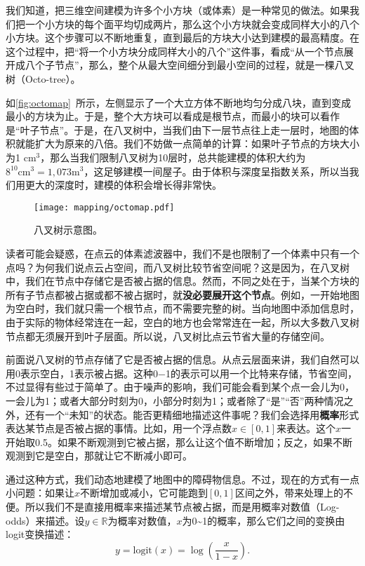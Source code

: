 我们知道，把三维空间建模为许多个小方块（或体素）是一种常见的做法。如果我们把一个小方块的每个面平均切成两片，那么这个小方块就会变成同样大小的八个小方块。这个步骤可以不断地重复，直到最后的方块大小达到建模的最高精度。在这个过程中，把“将一个小方块分成同样大小的八个”这件事，看成“从一个节点展开成八个子节点”，那么，整个从最大空间细分到最小空间的过程，就是一棵八叉树（Octo-tree）。

如\autoref{fig:octomap}~所示，左侧显示了一个大立方体不断地均匀分成八块，直到变成最小的方块为止。于是，整个大方块可以看成是根节点，而最小的块可以看作是“叶子节点”。于是，在八叉树中，当我们由下一层节点往上走一层时，地图的体积就能扩大为原来的八倍。我们不妨做一点简单的计算：如果叶子节点的方块大小为1 cm$^3$，那么当我们限制八叉树为10层时，总共能建模的体积大约为$8^{10}\text{cm}^3 = 1,073\text{m}^3$，这足够建模一间屋子。由于体积与深度呈指数关系，所以当我们用更大的深度时，建模的体积会增长得非常快。

\begin{figure}[!ht]
	\centering
	\texttt{[image: mapping/octomap.pdf]}
	\caption{八叉树示意图。}
	\label{fig:octomap}
\end{figure}

读者可能会疑惑，在点云的体素滤波器中，我们不是也限制了一个体素中只有一个点吗？为何我们说点云占空间，而八叉树比较节省空间呢？这是因为，在八叉树中，我们在节点中存储它是否被占据的信息。然而，不同之处在于，当某个方块的所有子节点都被占据或都不被占据时，就\textbf{没必要展开这个节点}。例如，一开始地图为空白时，我们就只需一个根节点，而不需要完整的树。当向地图中添加信息时，由于实际的物体经常连在一起，空白的地方也会常常连在一起，所以大多数八叉树节点都无须展开到叶子层面。所以说，八叉树比点云节省大量的存储空间。

\newpage
前面说八叉树的节点存储了它是否被占据的信息。从点云层面来讲，我们自然可以用0表示空白，1表示被占据。这种0−1的表示可以用一个比特来存储，节省空间，不过显得有些过于简单了。由于噪声的影响，我们可能会看到某个点一会儿为0，一会儿为1；或者大部分时刻为0，小部分时刻为1；或者除了“是”“否”两种情况之外，还有一个“未知”的状态。能否更精细地描述这件事呢？我们会选择用\textbf{概率}形式表达某节点是否被占据的事情。比如，用一个浮点数$x \in [0,1]$来表达。这个$x$一开始取0.5。如果不断观测到它被占据，那么让这个值不断增加；反之，如果不断观测到它是空白，那就让它不断减小即可。

通过这种方式，我们动态地建模了地图中的障碍物信息。不过，现在的方式有一点小问题：如果让$x$不断增加或减小，它可能跑到$[0,1]$区间之外，带来处理上的不便。所以我们不是直接用概率来描述某节点被占据，而是用概率对数值（Log-odds）来描述。设$y \in \mathbb{R}$为概率对数值，$x$为0\textasciitilde1的概率，那么它们之间的变换由logit变换描述：
\begin{equation}
y = \mathrm{logit}(x) = \log \left( \frac{x}{1-x} \right).
\end{equation}


